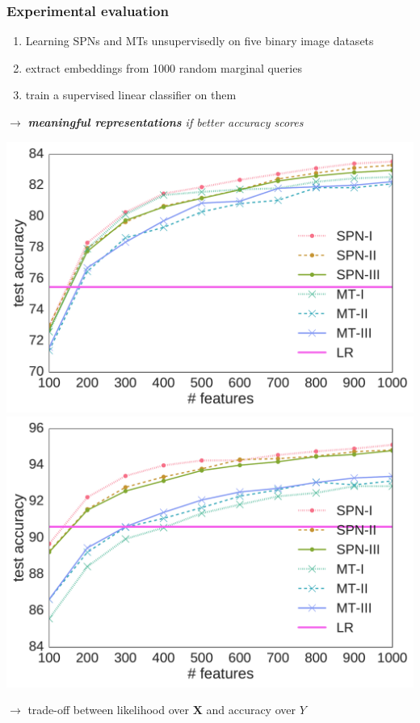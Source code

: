\documentclass[xcolor={usenames,dvipsnames,svgnames}, compress]{beamer}
\begin{document}
\begin{frame}[t]
  \frametitle{Experimental evaluation}
  \small
  \begin{enumerate}[I]
  \item Learning \textsf{SPNs} and \textsf{MTs} unsupervisedly on five
    binary image datasets
  \item extract embeddings from 1000 random marginal queries
  \item train a supervised linear classifier on them 
  \end{enumerate}
  \hspace{15pt}$\rightarrow$ \emph{\textbf{meaningful representations} if better accuracy scores}\\[7pt]
  \begin{center}
     \includegraphics[width=0.47\linewidth]{figures/lines-ocr_letters}\hfill\includegraphics[width=0.47\linewidth]{figures/lines-bmnist}
   \end{center}
   \hspace{15pt}$\rightarrow$ trade-off between likelihood over $\mathbf{X}$ and
   accuracy over $Y$
\end{frame}
\end{document}
